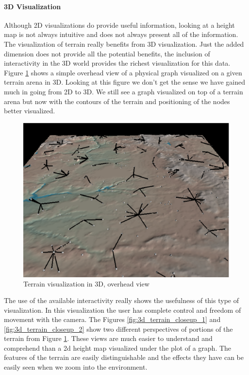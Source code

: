 \paragraph{3D Visualization}
Although 2D visualizations do provide useful information, looking at a height map is not always intuitive and does not always present all of the information.  The visualization of terrain really benefits from 3D visualization.  Just the added dimension does not provide all the potential benefits, the inclusion of interactivity in the 3D world provides the richest visualization for this data.  Figure \ref{fig:3d_terrain_overhead} shows a simple overhead view of a physical graph visualized on a given terrain arena in 3D.  Looking at this figure we don't get the sense we have gained much in going from 2D to 3D.  We still see a graph visualized on top of a terrain arena but now with the contours of the terrain and positioning of the nodes better visualized.

\begin{figure}[ht]
\centering
  \includegraphics[scale=0.75]{images/network_vis/3D_terrain.eps}
  \caption{Terrain visualization in 3D, overhead view}
\label{fig:3d_terrain_overhead}
\end{figure}

The use of the available interactivity really shows the usefulness of this type of visualization.  In this visualization the user has complete control and freedom of movement with the camera.  The Figures \ref{fig:3d_terrain_closeup_1} and \ref{fig:3d_terrain_closeup_2} show two different perspectives of portions of the terrain from Figure \ref{fig:3d_terrain_overhead}.  These views are much easier to understand and comprehend than a 2d height map visualized under the plot of a graph.  The features of the terrain are easily distinguishable and the effects they have can be easily seen when we zoom into the environment.

